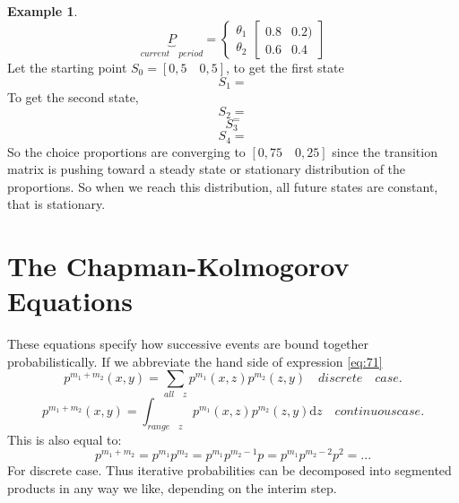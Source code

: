\documentclass[lecture,12pt,]{pcms-l}
\numberwithin{section}{chapter}
\numberwithin{equation}{chapter}
\theoremstyle{plain}
\theoremstyle{definition}
\newtheorem{example}{Example}[section]
\theoremstyle{definition}
\begin{document}
\begin{example}
\begin{equation}
\underbrace{P}_{current \quad period}=
\left\{\begin{matrix}
\theta_1\\ 
\theta_2
\end{matrix}\right.
\begin{bmatrix}
0.8 & 0.2)\\ 
0.6 &0.4
\end{bmatrix}
\end{equation}
Let the starting point $S_0 = \left [ 0,5 \quad 0,5 \right ] $, to get the first state 
\begin{equation}
S_1=
\end{equation}
To get the second state,
\begin{equation}
S_2=
\end{equation}
\begin{equation}
S_3^=
\end{equation}
\begin{equation}
S_4=
\end{equation}
So the choice proportions are converging to $\left [  0,75 \quad 0,25\right ]$ since the transition matrix is pushing toward a steady state or stationary distribution of the proportions. So when we reach this distribution, all future states are constant, that is stationary.
\end{example}

\section{The Chapman-Kolmogorov Equations}
These equations specify how successive events are bound together probabilistically. If we abbreviate the hand side of expression \ref{eq:71}
\begin{equation}
p^{m_1+m_2}(x,y)=\sum_{all \quad z}p^{m_1}(x,z)p^{m_2}(z,y) \quad discrete \quad case.
\end{equation}
\begin{equation}
p^{m_1+m_2}(x,y)=\int_{range \quad z}p^{m_1}(x,z)p^{m_2}(z,y) \mathrm{d}z \quad continuous case.
\end{equation}
This is also equal to:
\begin{equation}
p^{m_1+m_2}=p^{m_1}p^{m_2}=p^{m_1}p^{m_2-1}p=p^{m_1}p^{m_2-2}p^2=...
\end{equation}
For discrete case. Thus iterative probabilities can be decomposed into segmented products in any way we like, depending on the interim step.
\end{document}
